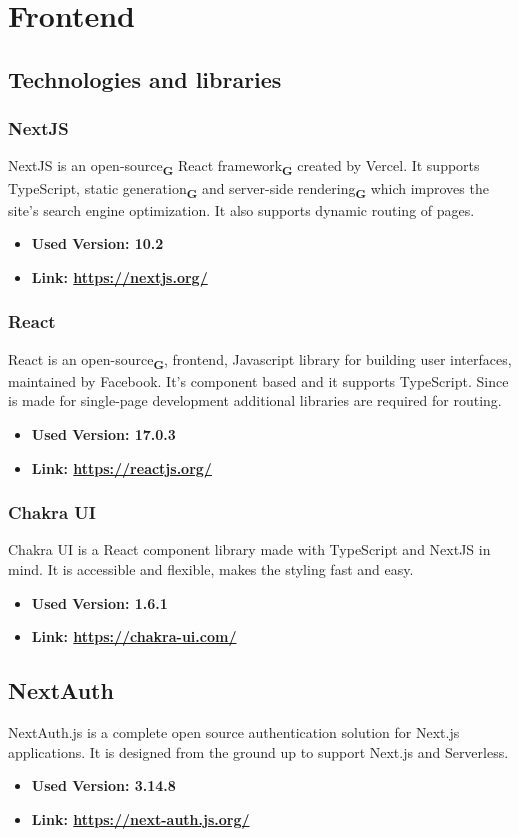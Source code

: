 \section{Frontend}
\subsection{Technologies and libraries}
\subsubsection{NextJS}
NextJS is an open-source\textsubscript{\textbf{G}} React framework\textsubscript{\textbf{G}} created by Vercel. It supports TypeScript, static generation\textsubscript{\textbf{G}} and server-side rendering\textsubscript{\textbf{G}} which improves the site's search engine optimization. It also supports dynamic routing of pages.
\begin{itemize}
  \item \textbf{Used Version: 10.2}
  \item \textbf{Link: \url{https://nextjs.org/}}
\end{itemize}
\subsubsection{React}
React is an open-source\textsubscript{\textbf{G}}, frontend, Javascript library for building user interfaces, maintained by Facebook. It's component based and it supports TypeScript. Since is made for single-page development additional libraries are required for routing.
\begin{itemize}
  \item \textbf{Used Version: 17.0.3}
  \item \textbf{Link: \url{https://reactjs.org/}}
\end{itemize}
\subsubsection{Chakra UI}
Chakra UI is a React component library made with TypeScript and NextJS in mind. It is accessible and flexible, makes the styling fast and easy.
\begin{itemize}
  \item \textbf{Used Version: 1.6.1}
  \item \textbf{Link: \url{https://chakra-ui.com/}}
\end{itemize}
\subsection{NextAuth}
NextAuth.js is a complete open source authentication solution for Next.js applications. It is designed from the ground up to support Next.js and Serverless.
\begin{itemize}
  \item \textbf{Used Version: 3.14.8}
  \item \textbf{Link: \url{https://next-auth.js.org/}}
\end{itemize}
